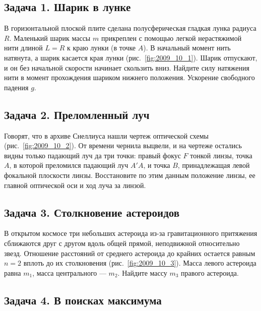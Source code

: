 \clearpage


\subsection*{Задача 1. Шарик в лунке}

В горизонтальной плоской плите сделана полусферическая гладкая лунка
радиуса $R$. Маленький шарик массы $m$ прикреплен с помощью легкой
нерастяжимой нити длиной $L=R$ к краю лунки (в точке $A$). В начальный
момент нить натянута, а шарик касается края лунки
(рис.~\ref{fig:2009_10_1}). Шарик отпускают, и он без начальной
скорости начинает скользить вниз. Найдите силу натяжения нити в момент
прохождения шариком нижнего положения. Ускорение свободного падения
$g$.


\subsection*{Задача 2. Преломленный луч}

Говорят, что в архиве Снеллиуса нашли чертеж оптической схемы
(рис.~\ref{fig:2009_10_2}). От времени чернила выцвели, и на чертеже
остались видны только падающий луч да три точки: правый фокус $F$
тонкой линзы, точка $A$, в которой преломился падающий луч $A'A$, и
точка $B$, принадлежащая левой фокальной плоскости линзы. Восстановите
по этим данным положение линзы, ее главной оптической оси и ход луча
за линзой.


\subsection*{Задача 3. Столкновение астероидов}

В открытом космосе три небольших астероида из-за гравитационного
притяжения сближаются друг с другом вдоль общей прямой, неподвижной
относительно звезд. Отношение расстояний от среднего астероида до
крайних остается равным $n=2$ вплоть до их столкновения
(рис.~\ref{fig:2009_10_3}). Масса левого астероида равна $m_1$, масса
центрального --- $m_2$. Найдите массу $m_3$ правого астероида.

\subsection*{Задача 4. В поисках максимума}

